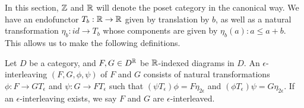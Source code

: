 In this section, $\mathbb{Z}$ and $\mathbb{R}$ will denote the poset category in the canonical way. We have an endofunctor $T_b:\mathbb{R}\rightarrow \mathbb{R}$ given by translation by $b$, as well as a natural transformation $\eta_b:id\rightarrow T_b$ whose components are given by $\eta_b(a):a\leq a+b$. This allows us to make the following definitions.

\begin{definition}\label{def:epsilon_interleaving}
Let $D$ be a category, and $F,G\in D^{\mathbb{R}}$ be $\mathbb{R}$-indexed diagrams in $D$. An $\epsilon$-interleaving $(F,G,\phi,\psi)$ of $F$ and $G$ consists of natural transformations $\phi:F\rightarrow GT_{\epsilon}$ and $\psi:G\rightarrow FT_\epsilon$ such that $(\psi T_\epsilon)\phi=F\eta_{2\epsilon}$ and $(\phi T_\epsilon)\psi=G\eta_{2\epsilon}$. If an $\epsilon$-interleaving exists, we say $F$ and $G$ are $\epsilon$-interleaved.
\end{definition}





